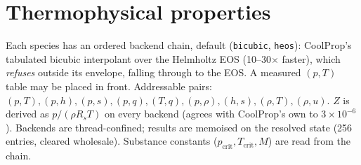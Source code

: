 \documentclass[11pt,a4paper]{article}
\newcommand{\code}[1]{\texttt{#1}}
\begin{document}
\section{Thermophysical properties}\label{sec:props}
Each species has an ordered backend chain, default (\code{bicubic}, \code{heos}):
CoolProp's tabulated bicubic interpolant over the Helmholtz EOS (10--30$\times$
faster), which \emph{refuses} outside its envelope, falling through to the EOS.
A measured $(p,T)$ table may be placed in front. Addressable pairs:
$(p,T),(p,h),(p,s),(p,q),(T,q),(p,\rho),(h,s),(\rho,T),(\rho,u)$. $Z$ is derived
as $p/(\rho R_sT)$ on every backend (agrees with CoolProp's own to $3\times10^{-6}$).
Backends are thread-confined; results are memoised on the resolved
state (256 entries, cleared wholesale). Substance constants
($p_{\mathrm{crit}},T_{\mathrm{crit}},M$) are read from the chain.

\end{document}
